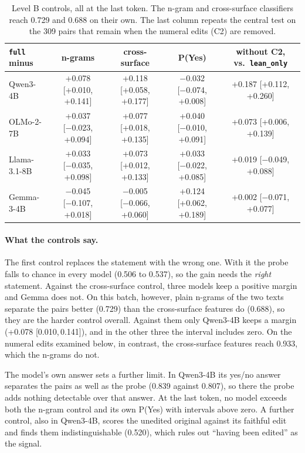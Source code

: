 \documentclass[10pt]{article}
\newcommand{\vr}[1]{\texttt{#1}}
\newcommand{\ic}[2]{[#1,\,#2]}
\begin{document}
\begin{table}[h]
\centering
\caption{Level B controls, all at the last token. The n-gram and cross-surface classifiers reach 0.729 and 0.688 on their own. The last column repeats the central test on the 309 pairs that remain when the numeral
edits (C2) are removed.}
\label{tab:bcontroles}
\vspace{2pt}
{\footnotesize\setlength{\tabcolsep}{3pt}
\begin{tabular}{@{}lcccc@{}}
\toprule
\vr{full} minus & n-grams & cross-surface & P(Yes) & without C2, vs.\ \vr{lean\_only}\\
\midrule
Qwen3-4B     & +0.078 [+0.010, +0.141] & +0.118 [+0.058, +0.177] & −0.032 [−0.074, +0.008] & +0.187 [+0.112, +0.260]\\
OLMo-2-7B    & +0.037 [−0.023, +0.094] & +0.077 [+0.018, +0.135] & +0.040 [−0.010, +0.091] & +0.073 [+0.006, +0.139]\\
Llama-3.1-8B & +0.033 [−0.035, +0.098] & +0.073 [+0.012, +0.133] & +0.033 [−0.022, +0.085] & +0.019 [−0.049, +0.088]\\
Gemma-3-4B   & −0.045 [−0.107, +0.018] & −0.005 [−0.066, +0.060] & +0.124 [+0.062, +0.189] & +0.002 [−0.071, +0.077]\\
\bottomrule
\end{tabular}}
\end{table}

\paragraph{What the controls say.}
The first control replaces the statement with the wrong one. With it the probe falls to chance in every model
(0.506 to 0.537), so the gain needs the \emph{right} statement. Against the cross-surface control, three models
keep a positive margin and Gemma does not. On this batch, however, plain n-grams of the two
texts separate the pairs better (0.729) than the cross-surface features do (0.688), so they are the harder control
overall. Against them only Qwen3-4B keeps a margin (+0.078 \ic{0.010}{0.141}), and in the other three the interval
includes zero. On the numeral edits examined below, in contrast, the cross-surface features reach 0.933, which the
n-grams do not.

The model's own answer sets a further limit. In Qwen3-4B its yes/no answer separates the pairs as well as the probe
(0.839 against 0.807), so there the probe adds nothing detectable over that answer. At the last token, no model
exceeds both the n-gram control and its own P(Yes) with intervals above zero. A further control, also in Qwen3-4B,
scores the unedited original against its faithful edit and finds them indistinguishable (0.520), which rules out
``having been edited'' as the signal.
\end{document}
